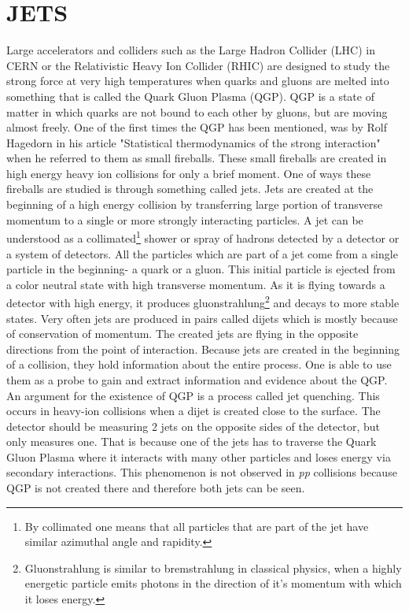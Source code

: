\documentclass[a4paper,10pt]{article}
\begin{document}
\section{JETS}
\label{jets}
Large accelerators and colliders such as the Large Hadron Collider (LHC) in CERN or the Relativistic Heavy Ion Collider (RHIC) are designed to study the strong force at very high temperatures when quarks and gluons are melted into something that is called the Quark Gluon Plasma (QGP)\cite{Cunqueiro_2022}. QGP is a state of matter in which quarks are not bound to each other by gluons, but are moving almost freely. One of the first times the QGP has been mentioned, was by Rolf Hagedorn in his article "Statistical thermodynamics of the strong interaction"\cite{hagedorn} when he referred to them as small fireballs. These small fireballs are created in high energy heavy ion collisions for only a brief moment. One of ways these fireballs are studied is through something called jets. Jets are created at the beginning of a high energy collision by transferring large portion of transverse momentum to a single or more strongly interacting particles. 
\newline
\noindent A jet can be understood as a collimated\footnote{By collimated one means that all particles that are part of the jet have similar azimuthal angle and rapidity.} shower or spray of hadrons detected by a detector or a system of detectors. All the particles which are part of a jet come from a single particle in the beginning- a quark or a gluon. This initial particle is ejected from a color neutral state with high transverse momentum. As it is flying towards a detector with high energy, it produces gluonstrahlung\footnote{Gluonstrahlung is similar to bremstrahlung in classical physics, when a highly energetic particle emits photons in the direction of it's momentum with which it loses energy.\cite{L2016Radioactivity}} and decays to more stable states. Very often jets are produced in pairs called dijets which is mostly because of conservation of momentum. The created jets are flying in the opposite directions from the point of interaction. 
\newline
\noindent Because jets are created in the beginning of a collision, they hold information about the entire process. One is able to use them as a probe to gain and extract information and evidence about the QGP. An argument for the existence of QGP is a process called jet quenching. This occurs in heavy-ion collisions when a dijet is created close to the surface. The detector should be measuring 2 jets on the opposite sides of the detector, but only measures one. That is because one of the jets has to traverse the Quark Gluon Plasma where it interacts with many other particles and loses energy via secondary interactions. This phenomenon is not observed in \textit{pp} collisions because QGP is not created there and therefore both jets can be seen\cite{casalderreysolana2007introductory}.
\end{document}
